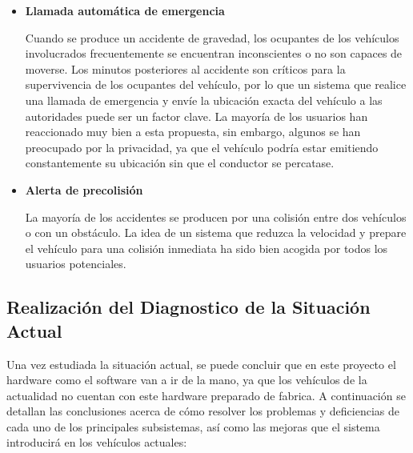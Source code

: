 \begin{itemize}[-]
\item \textbf{Llamada automática de emergencia}
\par Cuando se produce un accidente de gravedad, los ocupantes de los vehículos involucrados frecuentemente se encuentran inconscientes o no son capaces de moverse. Los minutos posteriores al accidente son críticos para la supervivencia de los ocupantes del vehículo, por lo que un sistema que realice una llamada de emergencia y envíe la ubicación exacta del vehículo a las autoridades puede ser un factor clave. La mayoría de los usuarios han reaccionado muy bien a esta propuesta, sin embargo, algunos se han preocupado por la privacidad, ya que el vehículo podría estar emitiendo constantemente su ubicación sin que el conductor se percatase.

\item \textbf{Alerta de precolisión}
\par La mayoría de los accidentes se producen por una colisión entre dos vehículos o con un obstáculo. La idea de un sistema que reduzca la velocidad y prepare el vehículo para una colisión inmediata ha sido bien acogida por todos los usuarios potenciales.


\end{itemize}

\subsection{Realización del Diagnostico de la Situación Actual}
\par Una vez estudiada la situación actual, se puede concluir que en este proyecto el hardware como el software van a ir de la mano, ya que los vehículos de la actualidad no cuentan con este hardware preparado de fabrica. A continuación se detallan las conclusiones acerca de cómo resolver los problemas y deficiencias de cada uno de los principales subsistemas, así como las mejoras que el sistema introducirá en los vehículos actuales:

